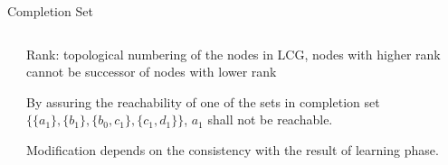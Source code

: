 \documentclass[8pt]{beamer}
\begin{document}
\begin{frame}{Completion Set}
    
    
\vspace{0.5cm}    
\begin{columns}
\begin{column}{0.65\textwidth}
    
\end{column}
\begin{column}{0.35\textwidth}
Rank: topological numbering of the nodes in LCG, nodes with higher rank cannot be successor of nodes with lower rank

\vspace{0.2cm}
By assuring the reachability of one of the sets in completion set $\{\{a_1\},\{b_1\},\{b_0,c_1\},\{c_1,d_1\}\}$, $a_1$ shall not be reachable.

\vspace{0.2cm}
Modification depends on the consistency with the result of learning phase.
\end{column}
\end{columns} 
\end{frame} 
\end{document}
